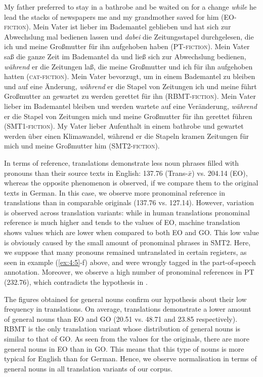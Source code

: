\documentclass[output=paper]{LSP/langsci}
\begin{document}
\ea \label{ex:4:5}
\ea My father preferred to stay in a bathrobe and be waited on for a change \textit{while} he lead the stacks of newspapers me and my grandmother saved for him (EO-\textsc{fiction}).
\ex Mein Vater ist lieber im Bademantel geblieben und hat sich zur Abwechslung mal bedienen lassen und \textit{dabei} die Zeitungsstapel durchgelesen, die ich und meine Großmutter für ihn aufgehoben haben (PT-\textsc{fiction}).
\ex Mein Vater saß die ganze Zeit im Bademantel da und ließ sich zur Abwechslung bedienen, \textit{während} er die Zeitungen laß, die meine Großmutter und ich für ihn aufgehoben hatten (\textsc{cat}-\textsc{fiction}).
\ex Mein Vater bevorzugt, um in einem Bademantel zu bleiben und auf eine Änderung, \textit{während} er die Stapel von Zeitungen ich und meine führt Großmutter an gewartet zu werden gerettet für ihn (RBMT-\textsc{fiction}). 
\ex Mein Vater lieber im Bademantel bleiben und werden wartete auf eine Veränderung, \textit{während} er die Stapel von Zeitungen mich und meine Großmutter für ihn gerettet führen (SMT1-\textsc{fiction}).
\ex My Vater lieber Aufenthalt in einem bathrobe und gewartet werden über einen Klimawandel, während er die Stapeln kramen Zeitungen für mich und meine Großmutter him (SMT2-\textsc{fiction}).
\z
\z

In terms of reference, translations demonstrate less noun phrases filled with pronouns than their source texts in English: 137.76 (Trans-$\bar{x}$) vs. 204.14 (EO), whereas the opposite phenomenon is observed, if we compare them to the original texts in German. In this case, we observe more pronominal reference in translations than in comparable originals (137.76 vs. 127.14). However, variation is observed across translation variants: while in human translations pronominal reference is much higher and tends to the values of EO, machine translation shows values which are lower when compared to both EO and GO. This low value is obviously caused by the small amount of pronominal phrases in SMT2. Here, we suppose that many pronouns remained untranslated in certain registers, as seen in example (\ref{ex:4:5}-f) above, and were wrongly tagged in the part-of-speech annotation. Moreover, we observe a high number of pronominal references in PT (232.76), which contradicts the hypothesis in .

The figures obtained for general nouns confirm our hypothesis about their low frequency in translations. On average, translations demonstrate a lower amount of general nouns than EO and GO (20.51 vs. 48.71 and 23.85 respectively). RBMT is the only translation variant whose distribution of general nouns is similar to that of GO. As seen from the values for the originals, there are more general nouns in EO than in GO. This means that this type of nouns is more typical for English than for German. Hence, we observe normalisation in terms of general nouns in all translation variants of our corpus. 
\end{document}
